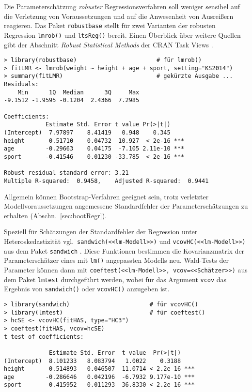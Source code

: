 Die Parameterschätzung \emph{robuster} Regressionsverfahren soll weniger sensibel auf die Verletzung von Voraussetzungen und auf die Anwesenheit von Ausreißern reagieren. Das Paket \lstinline!robustbase! stellt für zwei Varianten der robusten Regression \lstinline!lmrob()! und  \lstinline!ltsReg()! bereit. Einen Überblick über weitere Quellen gibt der Abschnitt \emph{Robust Statistical Methods} der CRAN Task Views \cite{CRANtvRobust}.
\begin{lstlisting}
> library(robustbase)                       # für lmrob()
> fitLMR <- lmrob(weight ~ height + age + sport, setting="KS2014")
> summary(fitLMR)                           # gekürzte Ausgabe ...
Residuals:
    Min      1Q  Median      3Q     Max 
-9.1512 -1.9595 -0.1204  2.4366  7.2985 

Coefficients:
            Estimate Std. Error t value Pr(>|t|)    
(Intercept)  7.97897    8.41419   0.948    0.345    
height       0.51710    0.04732  10.927  < 2e-16 ***
age         -0.29663    0.04175  -7.105 2.11e-10 ***
sport       -0.41546    0.01230 -33.785  < 2e-16 ***

Robust residual standard error: 3.21 
Multiple R-squared:  0.9458,    Adjusted R-squared:  0.9441
\end{lstlisting}

Allgemein können Bootstrap-Verfahren geeignet sein, trotz verletzter Modellvoraussetzungen angemessene Standardfehler der Parameterschätzungen zu erhalten (Abschn.\ \ref{sec:bootRegr}).

Speziell für Schätzungen der Standardfehler der Regression unter Heteroskedastizität vgl.\ \lstinline!sandwich(<<lm-Modell>>)! und \lstinline!vcovHC(<<lm-Modell>>)! aus dem Paket \lstinline!sandwich! \cite{Zeileis2004}. Diese Funktionen bestimmen die Kovarianzmatrix der Parameterschätzer eines mit \lstinline!lm()! angepassten Modells neu. Wald-Tests der Parameter können dann mit \lstinline!coeftest(<<lm-Modell>>, vcov=<<Schätzer>>)! aus dem Paket  \lstinline!lmtest! durchgeführt werden, wobei für das Argument \lstinline!vcov! das Ergebnis von \lstinline!sandwich()! oder \lstinline!vcovHC()! anzugeben ist.
\begin{lstlisting}
> library(sandwich)                       # für vcovHC()
> library(lmtest)                         # für coeftest()
> hcSE <- vcovHC(fitHAS, type="HC3")
> coeftest(fitHAS, vcov=hcSE)
t test of coefficients:

             Estimate Std. Error  t value  Pr(>|t|)
(Intercept)  8.101233   8.083794   1.0022    0.3188
height       0.514893   0.046507  11.0714 < 2.2e-16 ***
age         -0.286646   0.042196  -6.7932 9.177e-10 ***
sport       -0.415952   0.011293 -36.8330 < 2.2e-16 ***
\end{lstlisting}

